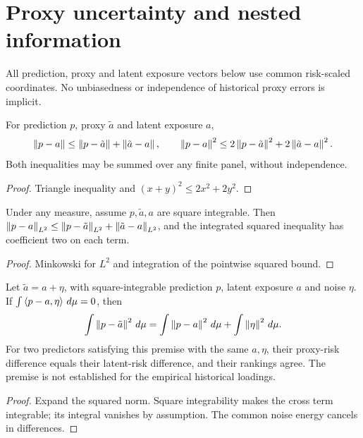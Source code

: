 \section{Proxy uncertainty and nested information}\label{sec:bp-proxy}

All prediction, proxy and latent exposure vectors below use common risk-scaled
coordinates. No unbiasedness or independence of historical proxy
errors is implicit.

\begin{lemma}\label{thm:proxy-error}
  \leanok
  For prediction $p$, proxy $\tilde a$ and latent exposure $a$,
  \[
    \left\lVert p-a\right\rVert\le\left\lVert p-\tilde a\right\rVert+\left\lVert\tilde a-a\right\rVert,\qquad
    \left\lVert p-a\right\rVert^2\le2\left\lVert p-\tilde a\right\rVert^2+2\left\lVert\tilde a-a\right\rVert^2.
  \]
  Both inequalities may be summed over any finite panel, without independence.
\end{lemma}
\begin{proof}\leanok
  Triangle inequality and $(x+y)^2\le2x^2+2y^2$.
\end{proof}

\begin{lemma}\label{thm:proxy-integrated}
  \leanok
  Under any measure, assume $p,\tilde a,a$ are square integrable. Then
  $\left\lVert p-a\right\rVert_{L^2}\le\left\lVert p-\tilde a\right\rVert_{L^2}+\left\lVert\tilde a-a\right\rVert_{L^2}$,
  and the integrated squared inequality has coefficient two on each term.
\end{lemma}
\begin{proof}\leanok
  Minkowski for $L^2$ and integration of the pointwise squared bound.
\end{proof}

\begin{theorem}\label{thm:proxy-orthogonal}
  \leanok
  Let $\tilde a=a+\eta$, with square-integrable prediction $p$, latent exposure
  $a$ and noise $\eta$. If $\int\left\langle p-a,\eta\right\rangle\,d\mu=0$, then
  \[
    \int\left\lVert p-\tilde a\right\rVert^2\,d\mu
    =\int\left\lVert p-a\right\rVert^2\,d\mu+\int\left\lVert\eta\right\rVert^2\,d\mu.
  \]
  For two predictors satisfying this premise with the same $a,\eta$, their
  proxy-risk difference equals their latent-risk difference, and their rankings
  agree. The premise is not established for the empirical historical loadings.
\end{theorem}
\begin{proof}\leanok
  Expand the squared norm. Square integrability makes the cross term integrable;
  its integral vanishes by assumption. The common noise energy
  cancels in differences.
\end{proof}

